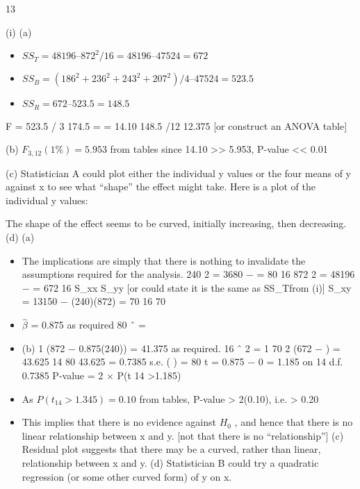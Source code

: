 \documentclass[a4paper,12pt]{article}
\begin{document}

13
\item (i)
(a)
\begin{itemize}
\item $ { \displaystyle SS_T = 48196 – 872^2 /16 = 48196 – 47524 = 672 }$
\item $ { \displaystyle SS_B = (186^2 + 236^2 + 243^2 + 207^2 )/4 – 47524 = 523.5 }$
\item $ { \displaystyle SS_R = 672 – 523.5 = 148.5 }$
\end{itemize} 
F =
523.5 / 3 174.5
=
= 14.10
148.5 /12 12.375
[or construct an ANOVA table]
\item (b)
$F_{3,12} (1\%) = 5.953$ from tables
since 14.10 >> 5.953, P-value << 0.01
\item (c)
Statistician A could plot either the individual y values or the four
means of y against x to see what “shape” the effect might take.
Here is a plot of the individual y values:
\item The shape of the effect seems to be curved, initially increasing, then
decreasing.
(d)
(a)
\begin{itemize}
\item The implications are simply that there is nothing to invalidate the
assumptions required for the analysis.
240 2
= 3680 −
= 80
16
872 2
= 48196 −
= 672
16
S_{xx}
S_{yy}
[or could state it is the same as SS_{T}from (i)]
S_{xy} = 13150 −
(240)(872)
= 70
16
70
\item $\hat{\beta}$ = 0.875 as required
80
\alpha ˆ =

\item (b)
1
(872 − 0.875(240)) = 41.375 as required.
16
\sum ˆ 2 =
1
70 2
(672 −
) = 43.625
14
80
43.625
= 0.7385
s.e. (  ) =
80
t =
0.875 − 0
= 1.185 on 14 d.f.
0.7385
P-value = 2 × P(t 14 >1.185)
\item As $P(t_{14} >1.345) = 0.10$ from tables, P-value > 2(0.10), i.e. > 0.20
\item This implies that there is no evidence against $H_0$ , and hence that there
is no linear relationship between x and y.
[not that there is no “relationship”]
(c) Residual plot suggests that there may be a curved, rather than linear,
relationship between x and y.
(d) Statistician B could try a quadratic regression (or some other curved
form) of y on x.
\end{itemize}
\end{document}
